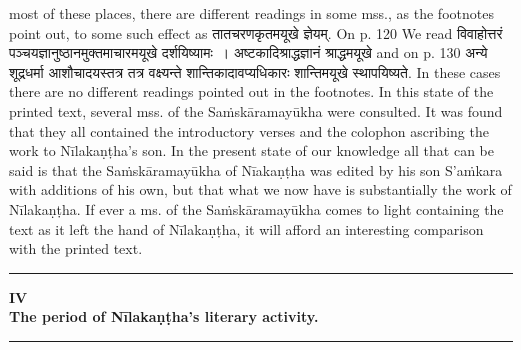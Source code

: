 \documentclass[11pt, openany]{book}
\begin{document}
\newpage

\noindent
most of these places, there are different readings in some mss., as the footnotes point out, to some such effect as {\qt तातचरणकृतमयूखे ज्ञेयम्}. On p. 120 We read {\qt विवाहोत्तरं पञ्चयज्ञानुष्ठानमुक्तमाचारमयूखे दर्शयिष्यामः~। अष्टकादिश्राद्धज्ञानं श्राद्धमयूखे} and on p. 130 {\qt अन्ये शूद्रधर्मा आशौचादयस्तत्र तत्र वक्ष्यन्ते शान्तिकादावप्यधिकारः शान्तिमयूखे स्थापयिष्यते}. In these cases there are no different readings pointed out in the footnotes. In this state of the printed text, several mss. of the Saṁskāramayūkha were consulted. It was found that they all contained the introductory verses and the colophon ascribing the work to Nīlakaṇṭha's son. In the present state of our knowledge all that can be said is that the Saṁskāramayūkha of Nīakaṇṭha was edited by his son S'aṁkara with additions of his own, but that what we now have is substantially the work of Nīlakaṇṭha. If ever a ms. of the Saṁskāramayūkha comes to light containing the text as it left the hand of Nīlakaṇṭha, it will afford an interesting comparison with the printed text.

\begin{center}
\rule{0.2\linewidth}{0.5pt}
\end{center}

\fancyhead[RE,LO]{\thepage}
\cfoot{}
\newpage
\renewcommand{\thepage}{\Roman{page}}
\setcounter{page}{25}


\begin{center}
\textbf{\large IV}\\

\vspace{1mm}
\textbf{\large The period of Nīlakaṇṭha's literary activity.}\\

\rule{0.2\linewidth}{0.5pt}
\end{center}
\end{document}
